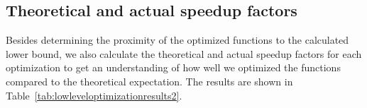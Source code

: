 \documentclass[11pt,a4paper]{report}
\theoremstyle{definition}
\begin{document}
\subsection{Theoretical and actual speedup factors}
Besides determining the proximity of the optimized functions to the calculated lower bound, we also calculate the theoretical and actual speedup factors for each optimization to get an understanding of how well we optimized the functions compared to the theoretical expectation. The results are shown in Table~\ref{tab:lowleveloptimizationresults2}.

\begin{table}[H]
  \centering
  \caption{Theoretical and actual speedup factors of the low-level optimizations for parameter set MEDS-55520. Factors are calculated as the ratio between the number of cycles that the reference function took to execute and the number of cycles that the optimized function took to execute. The cycle counts are taken from Table~\ref{tab:lowleveloptimizationresults} and are omitted here for brevity. Additionally, the definitions of $^*$, $^{**}$, and $^{***}$ are also taken from Table~\ref{tab:lowleveloptimizationresults}.}
  \vspace{0.5em}
\end{table}
\end{document}
